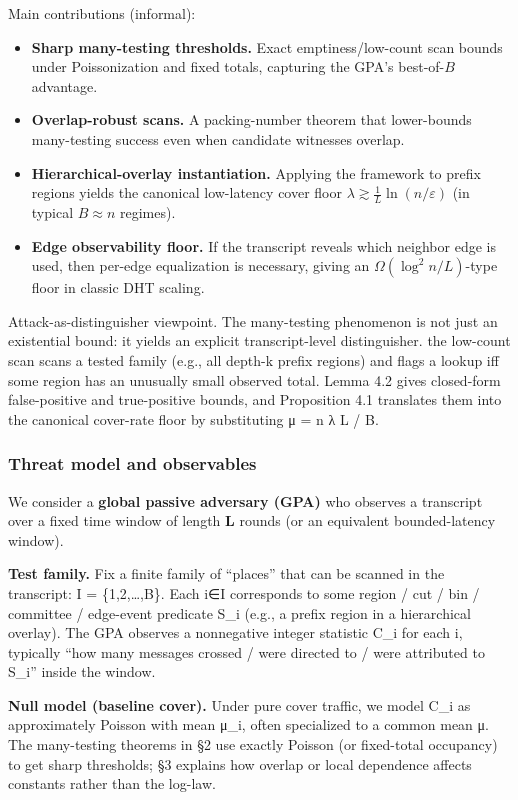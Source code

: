 \documentclass[
 11pt,
]{article}
\providecommand{\tightlist}{%
 \setlength{\itemsep}{0pt}\setlength{\parskip}{0pt}}
\begin{document}
Main contributions (informal):
\begin{itemize}\tightlist
\item \textbf{Sharp many-testing thresholds.} Exact emptiness/low-count scan bounds under
Poissonization and fixed totals, capturing the GPA's best-of-$B$ advantage.
\item \textbf{Overlap-robust scans.} A packing-number theorem that lower-bounds many-testing
success even when candidate witnesses overlap.
\item \textbf{Hierarchical-overlay instantiation.} Applying the framework to prefix regions
yields the canonical low-latency cover floor $\lambda \gtrsim \frac{1}{L}\ln(n/\varepsilon)$
(in typical $B\approx n$ regimes).
\item \textbf{Edge observability floor.} If the transcript reveals which neighbor edge is used,
then per-edge equalization is necessary, giving an $\Omega(\log^2 n/L)$-type floor in
classic DHT scaling.
\end{itemize}

Attack-as-distinguisher viewpoint. The many-testing phenomenon is not
just an existential bound: it yields an explicit transcript-level
distinguisher. the low-count scan scans a tested family (e.g., all depth-k
prefix regions) and flags a lookup iff some region has an unusually
small observed total. Lemma 4.2 gives closed-form false-positive and
true-positive bounds, and Proposition 4.1 translates them into the
canonical cover-rate floor by substituting μ = n λ L / B.

\subsubsection{Threat model and
observables}\label{threat-model-and-observables}

We consider a \textbf{global passive adversary (GPA)} who observes a
transcript over a fixed time window of length \textbf{L} rounds (or an
equivalent bounded-latency window).

\textbf{Test family.} Fix a finite family of ``places'' that can be
scanned in the transcript: I = \{1,2,\ldots,B\}. Each i∈I corresponds to
some region / cut / bin / committee / edge-event predicate S\_i (e.g., a
prefix region in a hierarchical overlay). The GPA observes a nonnegative
integer statistic C\_i for each i, typically ``how many messages crossed
/ were directed to / were attributed to S\_i'' inside the window.

\textbf{Null model (baseline cover).} Under pure cover traffic, we model
C\_i as approximately Poisson with mean μ\_i, often specialized to a
common mean μ. The many-testing theorems in §2 use exactly Poisson (or
fixed-total occupancy) to get sharp thresholds; §3 explains how overlap
or local dependence affects constants rather than the log-law.
\end{document}
